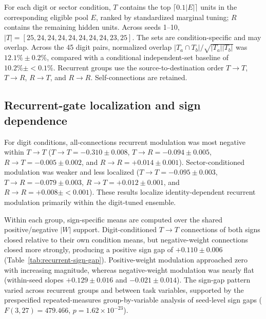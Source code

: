 For each digit or sector condition, \(T\) contains the top \(\lceil0.1|E|\rceil\) units in the corresponding eligible pool \(E\), ranked by standardized marginal tuning; \(R\) contains the remaining hidden units. Across seeds 1--10, \(|T|=[25,24,24,24,24,24,24,24,23,25]\). The sets are condition-specific and may overlap. Across the 45 digit pairs, normalized overlap \(|T_a\cap T_b|/\sqrt{|T_a||T_b|}\) was \(12.1\%\pm0.2\%\), compared with a conditional independent-set baseline of \(10.2\%\pm{<}0.1\%\). Recurrent groups use the source-to-destination order \(T\!\to\!T\), \(T\!\to\!R\), \(R\!\to\!T\), and \(R\!\to\!R\). Self-connections are retained.

\subsection{Recurrent-gate localization and sign dependence}

For digit conditions, all-connections recurrent modulation was most negative within \(T\!\to\!T\) (\(T\!\to\!T=-0.310\pm0.008\), \(T\!\to\!R=-0.094\pm0.005\), \(R\!\to\!T=-0.005\pm0.002\), and \(R\!\to\!R=+0.014\pm0.001\)). Sector-conditioned modulation was weaker and less localized (\(T\!\to\!T=-0.095\pm0.003\), \(T\!\to\!R=-0.079\pm0.003\), \(R\!\to\!T=+0.012\pm0.001\), and \(R\!\to\!R=+0.008\pm{<}0.001\)). These results localize identity-dependent recurrent modulation primarily within the digit-tuned ensemble.

Within each group, sign-specific means are computed over the shared positive/negative \(|W|\) support. Digit-conditioned \(T\!\to\!T\) connections of both signs closed relative to their own condition means, but negative-weight connections closed more strongly, producing a positive sign gap of \(+0.110\pm0.006\) (Table~\ref{tab:recurrent-sign-gap}). Positive-weight modulation approached zero with increasing magnitude, whereas negative-weight modulation was nearly flat (within-seed slopes \(+0.129\pm0.016\) and \(-0.021\pm0.014\)). The sign-gap pattern varied across recurrent groups and between task variables, supported by the prespecified repeated-measures group-by-variable analysis of seed-level sign gaps (\(F(3,27)=479.466\), \(p=1.62\times10^{-23}\)).

